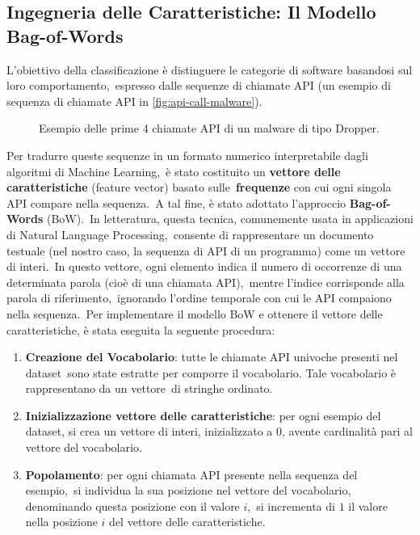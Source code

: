 \subsection{Ingegneria delle Caratteristiche: Il Modello Bag-of-Words}
\label{sec:ign-bofw}
L'obiettivo della classificazione è distinguere le categorie di software basandosi sul loro comportamento,\
espresso dalle sequenze di chiamate API (un esempio di sequenza di chiamate API in \autoref{fig:api-call-malware}).\

\begin{figure}[h!]
    \centering
    \caption{Esempio delle prime 4 chiamate API di un malware di tipo Dropper.}
    \label{fig:api-call-malware}
\end{figure}

Per tradurre queste sequenze in un formato numerico interpretabile dagli algoritmi di Machine Learning,\
è stato costituito un \textbf{vettore delle caratteristiche} (feature vector) basato sulle\
\textbf{frequenze} con cui ogni singola API compare nella sequenza.\
A tal fine, è stato adottato l'approccio \textbf{Bag-of-Words} (BoW).\
In letteratura, questa tecnica, comunemente usata in applicazioni di Natural Language Processing,\
consente di rappresentare un documento testuale (nel nostro caso, la sequenza di API di un programma) come un vettore di interi.\
In questo vettore, ogni elemento indica il numero di occorrenze di una determinata parola (cioè di una chiamata API),\
mentre l'indice corrisponde alla parola di riferimento,\
ignorando l'ordine temporale con cui le API compaiono nella sequenza.\
Per implementare il modello BoW e ottenere il vettore delle caratteristiche, è stata eseguita la seguente procedura:

\begin{enumerate}
    \item \textbf{Creazione del Vocabolario}: tutte le chiamate API univoche presenti nel dataset\
          sono state estratte per comporre il vocabolario. Tale vocabolario è rappresentano da un vettore\
          di stringhe ordinato.
    \item \textbf{Inizializzazione vettore delle caratteristiche}: per ogni esempio del dataset, si crea un vettore di interi,
          inizializzato a $0$, avente cardinalità pari al vettore del vocabolario.
    \item \textbf{Popolamento}: per ogni chiamata API presente nella sequenza del esempio,\
          si individua la sua posizione nel vettore del vocabolario, denominando questa posizione con il valore $i$,\
          si incrementa di $1$ il valore nella posizione $i$ del vettore delle caratteristiche.

\end{enumerate}

